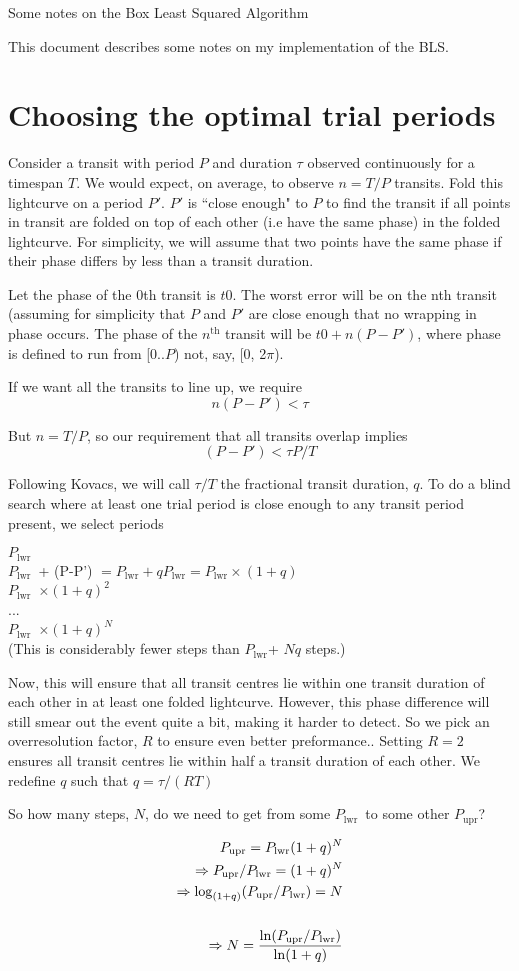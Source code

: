 \documentclass[11pt]{article}
\newcommand{\Plwr}{\ensuremath{P_{\mathrm{lwr}}}}
\newcommand{\Pupr}{\ensuremath{P_{\mathrm{upr}}}}
\begin{document}
\begin{center}
\begin{Huge} Some notes on the Box Least Squared Algorithm \end{Huge}
\end{center}

This document describes some notes on my implementation of the BLS.

\section{Choosing the optimal trial periods}

Consider a transit with period $P$ and duration $\tau$ observed continuously
for a timespan $T$. We would expect, on average, to observe $n = T/P$ transits.
Fold this lightcurve on a period $P'$. $P'$ is ``close enough" to $P$ to find the transit if
all points in transit are folded on top of each other (i.e have the same phase) in the folded lightcurve. For simplicity, we will assume that two points have the same phase if their phase differs by less than a transit duration.

Let the phase of the 0th transit is $t0$. The worst error will be on the nth transit (assuming for simplicity that $P$ and $P'$ are close enough that no wrapping in phase occurs. The phase of the $n^{\mathrm{th}}$ transit will be $t0 + n(P-P')$,  where  phase is defined to run from [0..$P$) not, say, [0, 2$\pi$).

If we want all the transits to line up, we require
$$
n(P-P') < \tau
$$

But $n = T/P$, so our requirement that all transits overlap implies 
$$
(P-P') < \tau P/T
$$

Following Kovacs, we will call $\tau/T$ the fractional transit duration, $q$.
To do a blind search where at least one trial period is close enough
to any transit period present, we select periods

\noindent
\Plwr\\
\Plwr\ + (P-P') $= \Plwr + q \Plwr = \Plwr \times (1+q)$\\
\Plwr\ $\times (1+q)^2$\\
...\\
\Plwr\ $\times (1+q)^N$\\

\noindent
(This is considerably fewer steps than \Plwr + $Nq$ steps.)

Now, this will ensure that all transit centres lie within one transit
duration of each other in at least one folded lightcurve. However, this phase difference will still smear out the event quite a bit, making it harder to detect. So we pick an overresolution factor, $R$ to
ensure even better preformance.. Setting $R=2$ ensures
all transit centres lie within half a transit duration of each other. We redefine $q$ such that
$q = \tau/(RT)$

So how many steps, $N$, do we need to get from some \Plwr\ to some other \Pupr?

\begin{eqnarray*}
\Pupr = \Plwr(1+q)^N\\
\Rightarrow \Pupr/\Plwr = (1+q)^N\\
\Rightarrow \log_{(1+q)} (\Pupr/\Plwr) = N\\
\vspace{1ex}\\
\Rightarrow N = \frac{\ln(\Pupr/\Plwr)}{ \ln(1+q)}
\end{eqnarray*}
\end{document}
